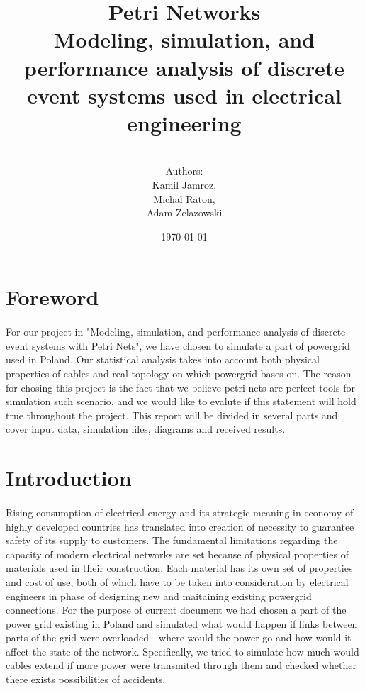 \documentclass[a4paper]{article}
\title{Petri Networks\\Modeling, simulation, and performance analysis of discrete event systems used in electrical engineering}
\author{\\Authors:\\ Kamil Jamroz,\\ Michal Raton,\\ Adam Zelazowski\\}
\date{\today}
\begin{document}
\maketitle

\clearpage

\tableofcontents

\clearpage

%
\section{Foreword}  

\paragraph{}
For our project in "Modeling, simulation, and performance analysis of discrete event systems with Petri Nets", we have chosen to simulate a part of powergrid used in Poland. Our statistical analysis takes into account both physical properties of cables and real topology on which powergrid bases on. The reason for chosing this project is the fact that we believe petri nets are perfect tools for simulation such scenario, and we would like to evalute if this statement will hold true throughout the project. This report will be divided in several parts and cover input data, simulation files, diagrams and received results.

%
\section{Introduction}   
\paragraph{}
Rising consumption of electrical energy and its strategic meaning in economy of highly developed countries has translated into creation of necessity to guarantee safety of its supply to customers. The fundamental limitations regarding the capacity of modern electrical networks are set because of physical properties of materials used in their construction. Each material has its own set of properties and cost of use, both of which have to be taken into consideration by electrical engineers in phase of designing new and maitaining existing powergrid connections. For the purpose of current document we had chosen a part of the power grid existing in Poland and simulated what would happen if links between parts of the grid were overloaded - where would the power go and how would it affect the state of the network. Specifically, we tried to simulate how much would cables extend if more power were transmited through them and checked whether there exists possibilities of accidents.
\end{document}

